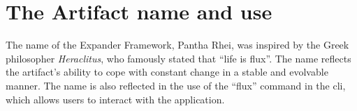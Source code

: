 \section{The Artifact name and use} \label{sec_artifact_name}

The name of the Expander Framework, Pantha Rhei, was inspired by the Greek philosopher
\emph{Heraclitus}, who famously stated that \enquote{life is flux}. The name reflects the
artifact's ability to cope with constant change in a stable and evolvable manner. The name
is also reflected in the use of the \enquote{flux} command in the \gls{cli}, which allows
users to interact with the application.